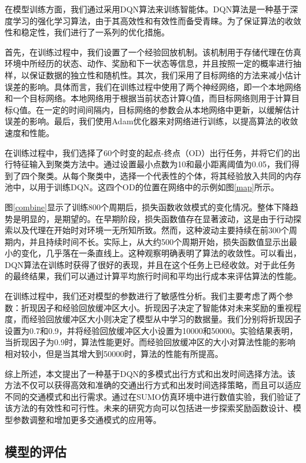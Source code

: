 在模型训练方面，我们通过采用DQN算法来训练智能体。DQN算法是一种基于深度学习的强化学习算法，由于其高效性和有效性而备受青睐。为了保证算法的收敛性和稳定性，我们进行了一系列的优化措施。

首先，在训练过程中，我们设置了一个经验回放机制。该机制用于存储代理在仿真环境中所经历的状态、动作、奖励和下一状态等信息，并且按照一定的概率进行抽样，以保证数据的独立性和随机性。其次，我们采用了目标网络的方法来减小估计误差的影响。具体而言，我们在训练过程中使用了两个神经网络，即一个本地网络和一个目标网络。本地网络用于根据当前状态计算Q值，而目标网络则用于计算目标Q值。在一定的时间间隔内，目标网络的参数会从本地网络中更新，以缓解估计误差的影响。最后，我们使用Adam优化器来对网络进行训练，以提高算法的收敛速度和性能。

在训练过程中，我们选择了60个时变的起点-终点（OD）出行任务，并将它们的出行特征输入到聚类方法中。通过设置最小点数为10和最小距离阈值为0.05，我们得到了四个聚类。从每个聚类中，选择一个代表性的个体，将其经验放入共同的内存池中，以用于训练DQN。这四个OD的位置在网络中的示例如图\ref{map}所示。

图\ref{combine}显示了训练800个周期后，损失函数收敛模式的变化情况。整体下降趋势是明显的，是期望的。在早期阶段，损失函数值存在显著波动，这是由于行动探索以及代理在开始时对环境一无所知所致。然而，这种波动主要持续在前300个周期内，并且持续时间不长。实际上，从大约500个周期开始，损失函数值显示出最小的变化，几乎落在一条直线上。这种观察明确表明了算法的收敛性。可以看出，DQN算法在训练时获得了很好的表现，并且在这个任务上已经收敛。对于此任务的最终结果，我们可以通过计算平均旅行时间和平均出行成本来评估算法的性能。

在训练过程中，我们还对模型的参数进行了敏感性分析。我们主要考虑了两个参数：折现因子和经验回放缓冲区大小。折现因子决定了智能体对未来奖励的重视程度，而经验回放缓冲区大小则决定了模型从中学习的数据量。我们分别将折现因子设置为0.7和0.9，并将经验回放缓冲区大小设置为10000和50000。实验结果表明，当折现因子为0.9时，算法性能更好。而经验回放缓冲区的大小对算法性能的影响相对较小，但是当其增大到50000时，算法的性能有所提高。

综上所述，本文提出了一种基于DQN的多模式出行方式和出发时间选择方法。该方法不仅可以获得高效和准确的交通出行方式和出发时间选择策略，而且可以适应不同的交通模式和出行需求。通过在SUMO仿真环境中进行数值实验，我们验证了该方法的有效性和可行性。未来的研究方向可以包括进一步探索奖励函数设计、模型参数调整和增加更多交通模式的应用等。
\subsection{模型的评估}

